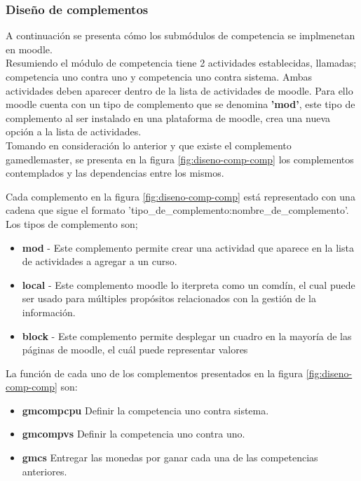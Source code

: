 

\subsubsection{Diseño de complementos}



A continuación se presenta cómo los submódulos de competencia
se implmenetan en moodle.\\


\noindent Resumiendo el módulo de competencia tiene 2 actividades establecidas, llamadas; 
competencia uno contra uno y competencia uno contra sistema. 
Ambas actividades deben aparecer dentro de la lista de actividades de moodle. Para ello 
moodle cuenta con un tipo de complemento que se denomina \textbf{'mod'}, este tipo de complemento al ser instalado 
en una plataforma de moodle, crea una nueva opción a la lista de actividades.\\

\noindent Tomando en consideración lo anterior y que existe el complemento gamedlemaster, se presenta en la figura \ref{fig:diseno-comp-comp}
los complementos contemplados y las dependencias entre los mismos.




Cada complemento en la figura \ref{fig:diseno-comp-comp} está representado con una cadena que sigue el formato 'tipo\_de\_complemento:nombre\_de\_complemento'. Los tipos de complemento son;
\begin{itemize}
    \item \textbf{mod} - Este complemento permite crear una actividad que aparece en la lista de actividades a agregar a un curso.
    \item \textbf{local} -  Este complemento moodle lo iterpreta como un comdín, el cual puede ser usado para múltiples propósitos relacionados con la gestión de la información.
    \item \textbf{block} - Este complemento permite desplegar un cuadro en la mayoría de las páginas de moodle, el cuál puede representar valores 
\end{itemize}

La función de cada uno de los complementos presentados en la figura \ref{fig:diseno-comp-comp} son:


\begin{itemize}
    \item \textbf{gmcompcpu} Definir la competencia uno contra sistema.
    \item \textbf{gmcompvs} Definir la competencia uno contra uno.
    \item \textbf{gmcs} Entregar las monedas por ganar cada una de las competencias anteriores.
\end{itemize}

